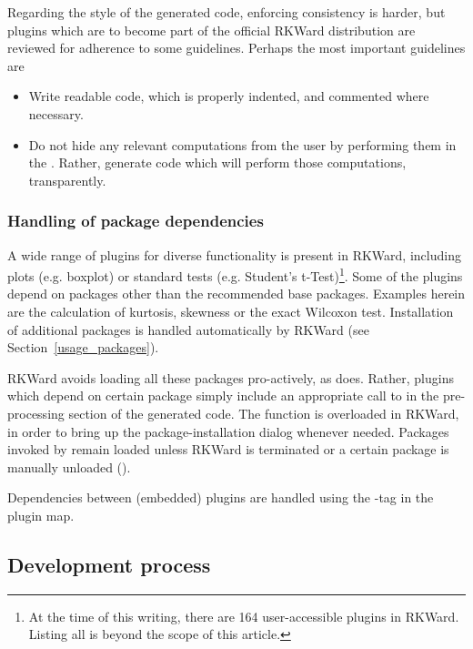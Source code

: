 Regarding the style of the generated  code, enforcing consistency is harder,
but plugins which are to become part of the official RKWard distribution are
reviewed for adherence to some guidelines. Perhaps the most important guidelines
are 

\begin{itemize}
  \item 
  Write readable code, which is properly indented, and commented where necessary.

  \item 
  Do not hide any relevant computations from the user by performing them in the
  . Rather, generate  code which will perform
  those computations, transparently.
\end{itemize}

\subsubsection[technical_plugins_dependencies]{Handling of  package dependencies}
A wide range of plugins for diverse functionality is present in RKWard,
including plots (e.g. boxplot) or standard tests (e.g. Student's t-Test)\footnote{
  At the time of this writing, there are 164 user-accessible plugins in RKWard.
  Listing all is beyond the scope of this article.
}. Some
of the plugins depend on  packages other than the recommended  base packages.
Examples herein are the calculation of kurtosis, skewness or the exact Wilcoxon
test. Installation of additional packages is handled automatically by RKWard
(see Section~\ref{usage_packages}).

RKWard avoids loading all these packages pro-actively, as  does. Rather,
plugins which depend on certain package simply include an appropriate call to
 in the pre-processing section of the generated  code. The 
function is overloaded in RKWard, in order to bring up the package-installation
dialog whenever needed. Packages invoked by  remain loaded unless
RKWard is terminated or a certain package is manually unloaded ().

Dependencies between (embedded) plugins are handled using the -tag in the plugin map.

\subsection[technical_processes]{Development process}
